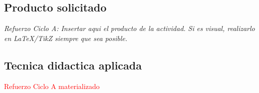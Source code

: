 \documentclass[
	spanish,
	letterpaper, oneside
]{article}
\newcommand{\pendiente}[1]{\textcolor{red}{Refuerzo Ciclo A materializado}}
\begin{document}
\subsection{Producto solicitado}

\textit{Refuerzo Ciclo A: Insertar aqui el producto de la actividad. Si es visual, realizarlo en LaTeX/TikZ siempre que sea posible.}

\subsection{Tecnica didactica aplicada}

\pendiente{Cuando la planeacion indique una tecnica de las 100 Tecnicas Didacticas de Ensenanza y Aprendizaje, explicar aqui como se uso. Ejemplo: "La tecnica seleccionada organiza la informacion mediante criterios visibles, jerarquia y cierre reflexivo; por ello, el producto no solo presenta datos, sino que demuestra analisis y comprension" \citep{unadm100TecnicasDidacticas2023}.}

%
\end{document}
